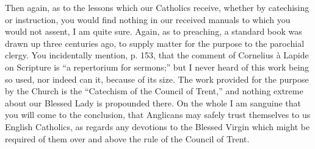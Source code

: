 Then again, as to the lessons which our Catholics receive, whether by
catechising or instruction, you would find nothing in our received
manuals to which you would not assent, I am quite sure. Again, as to
preaching, a standard book was drawn up three centuries ago, to supply
matter for the purpose to the parochial clergy. You incidentally
mention, p. 153, that the comment of Cornelius à Lapide on Scripture is
``a repertorium for sermons;'' but I never heard of this work
being so used, nor indeed can it, because of its size. The work provided
for the purpose by the Church is the ``Catechism of the Council of
Trent,'' and nothing extreme about our Blessed Lady is propounded
there. On the whole I am sanguine that you will come to the conclusion,
that Anglicans may safely trust themselves to us English
Catholics, as regards any devotions to the Blessed Virgin which might be
required of them over and above the rule of the Council of Trent.

